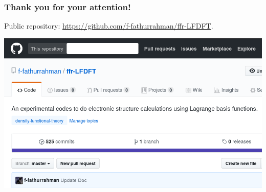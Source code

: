 \documentclass[10pt,t]{beamer}
\begin{document}
\begin{frame}[c]
\frametitle{Thank you for your attention!}
    
Public repository: \url{https://github.com/f-fathurrahman/ffr-LFDFT}.
    
{\centering
\includegraphics[scale=0.25]{images/ffr-LFDFT-github-cropped.png}
\par}

\end{frame}
\end{document}
